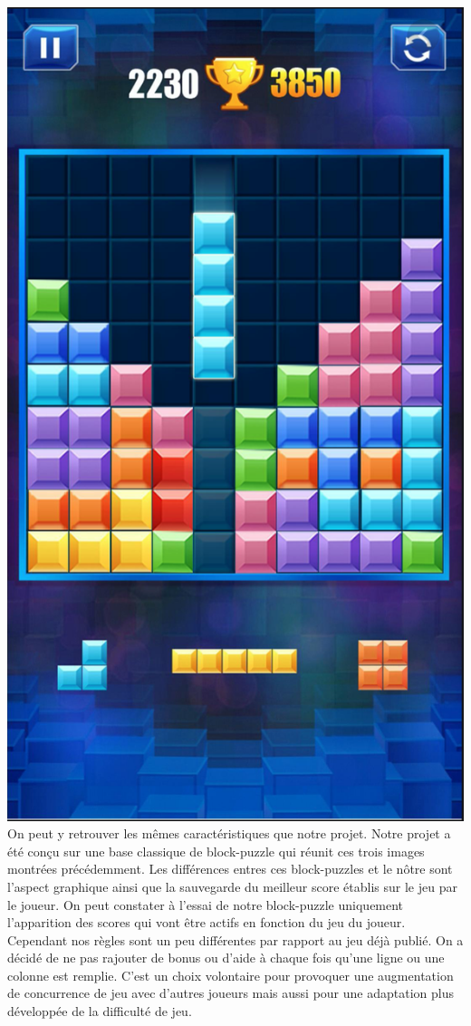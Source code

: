 \documentclass[]{report}
\begin{document}
\includegraphics[scale=0.3]{images/jeuxPublie3.png}\\

On peut y retrouver les mêmes caractéristiques que notre projet. Notre projet a été conçu sur une base classique de block-puzzle qui réunit ces trois images montrées précédemment. Les différences entres ces block-puzzles et le nôtre sont l'aspect graphique ainsi que la sauvegarde du meilleur score établis sur le jeu par le joueur. On peut constater à l'essai de notre block-puzzle uniquement l'apparition des scores qui vont être actifs en fonction du jeu du joueur. Cependant nos règles sont un peu différentes par rapport au jeu déjà publié. On a décidé de ne pas rajouter de bonus ou d'aide à chaque fois qu'une ligne ou une colonne est remplie. C'est un choix volontaire pour provoquer une augmentation de concurrence de jeu avec d'autres joueurs mais aussi pour une adaptation plus développée de la difficulté de jeu. 
\end{document}
